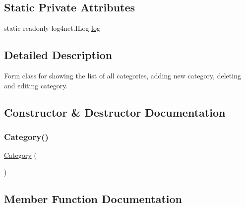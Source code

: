\subsection*{Static Private Attributes}
\begin{DoxyCompactItemize}
\item 
static readonly log4net.\+I\+Log \hyperlink{classWildlifeTrackingApp_1_1Category_ae6c6142b8525b2f4ac6ee6e003b3106f}{log}
\end{DoxyCompactItemize}


\subsection{Detailed Description}
Form class for showing the list of all categories, adding new category, deleting and editing category. 



\subsection{Constructor \& Destructor Documentation}
\mbox{\label{classWildlifeTrackingApp_1_1Category_a0e526c1d022adf4f003029e995a50ff7}} 
\subsubsection{\texorpdfstring{Category()}{Category()}}
{\footnotesize\ttfamily \hyperlink{classWildlifeTrackingApp_1_1Category}{Category} (\begin{DoxyParamCaption}{ }\end{DoxyParamCaption})\hspace{0.3cm}{\ttfamily [inline]}}



\subsection{Member Function Documentation}
\mbox{\label{classWildlifeTrackingApp_1_1Category_ae56b21bee08f5cad9858a264ccc21fd5}} 
